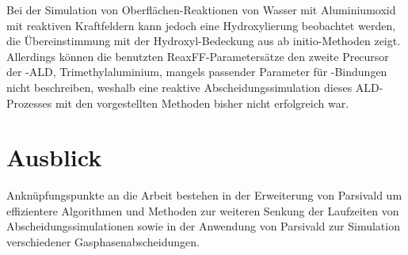 

Bei der Simulation von Oberflächen-Reaktionen von Wasser mit Aluminiumoxid mit reaktiven Kraftfeldern kann jedoch eine Hydroxylierung beobachtet werden, die Übereinstimmung mit der Hydroxyl-Bedeckung aus ab initio-Methoden zeigt.
Allerdings können die benutzten ReaxFF-Parametersätze den zweite Precursor der -ALD, Trimethylaluminium, mangels passender Parameter für -Bindungen nicht beschreiben, weshalb eine reaktive Abscheidungssimulation dieses ALD-Prozesses mit den vorgestellten Methoden bisher nicht erfolgreich war.

\section{Ausblick}
Anknüpfungspunkte an die Arbeit bestehen in der Erweiterung von Parsivald um effizientere Algorithmen und Methoden zur weiteren Senkung der Laufzeiten von Abscheidungssimulationen sowie in der Anwendung von Parsivald zur Simulation verschiedener Gasphasenabscheidungen.


